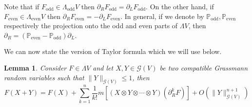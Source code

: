 \documentclass{article}
\newcommand{\tmop}[1]{\ensuremath{\operatorname{#1}}}
\newtheorem{lemma}[theorem]{Lemma}
\begin{document}
\begin{remark}
  Note that if $F_{\tmop{odd}} \in \Lambda_{\tmop{odd}} V$ then $\partial_R
  F_{\tmop{odd}} = \partial_L F_{\tmop{odd}}$. On the other hand, if
  $F_{\tmop{even}} \in \Lambda_{\tmop{even}} V$ then $\partial_R
  F_{\tmop{even}} = - \partial_L F_{\tmop{even}}$. In general, if we denote by
  $\mathbb{P}_{\tmop{odd}}, \mathbb{P}_{\tmop{even}}$ respectively the
  projection onto the odd and even parts of $\Lambda V$, then $\partial_R =
  (\mathbb{P}_{\tmop{even}} -\mathbb{P}_{\tmop{odd}}) \partial_L$.
\end{remark}

We can now state the version of Taylor formula which we will use below.

\begin{lemma}
  \label{lemma:taylor}Consider $F \in \Lambda V$ and let $X, Y \in \mathcal{G}
  (V)$ be two compatible Grassmann random variables such that $\| Y
  \|_{\mathcal{G} (V)} \leqslant 1$, then
  \begin{equation}
    F (X + Y) = F (X) + \sum_{k = 1}^n \frac{1}{k!} m [(X \otimes Y \otimes
    \cdots \otimes Y) (\partial_R^k F)] + O (\| Y \|^{n + 1}_{\mathcal{G}
    (V)}) \label{eq:taylor}
  \end{equation}
\end{lemma}
\end{document}
